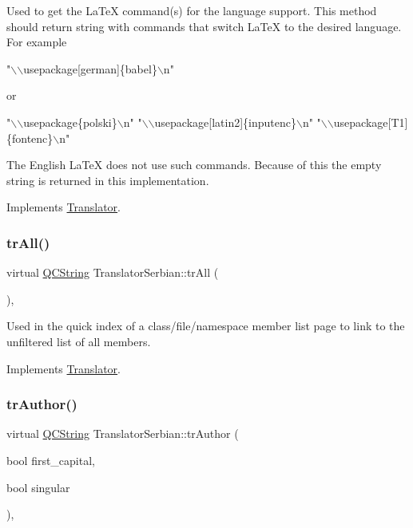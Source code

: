 Used to get the La\+TeX command(s) for the language support. This method should return string with commands that switch La\+TeX to the desired language. For example 
\begin{DoxyPre}"\(\backslash\)\(\backslash\)usepackage[german]\{babel\}\(\backslash\)n"
 \end{DoxyPre}
 or 
\begin{DoxyPre}"\(\backslash\)\(\backslash\)usepackage\{polski\}\(\backslash\)n"
 "\(\backslash\)\(\backslash\)usepackage[latin2]\{inputenc\}\(\backslash\)n"
 "\(\backslash\)\(\backslash\)usepackage[T1]\{fontenc\}\(\backslash\)n"
 \end{DoxyPre}


The English La\+TeX does not use such commands. Because of this the empty string is returned in this implementation. 

Implements \mbox{\hyperlink{class_translator}{Translator}}.

\mbox{\label{class_translator_serbian_a95cac05d61b9c60ec6ce2536bf28079c}} 
\subsubsection{\texorpdfstring{trAll()}{trAll()}}
{\footnotesize\ttfamily virtual \mbox{\hyperlink{class_q_c_string}{Q\+C\+String}} Translator\+Serbian\+::tr\+All (\begin{DoxyParamCaption}{ }\end{DoxyParamCaption})\hspace{0.3cm}{\ttfamily [inline]}, {\ttfamily [virtual]}}

Used in the quick index of a class/file/namespace member list page to link to the unfiltered list of all members. 

Implements \mbox{\hyperlink{class_translator}{Translator}}.

\mbox{\label{class_translator_serbian_a689feaebb833ec2ce0229e6b68cd3937}} 
\subsubsection{\texorpdfstring{trAuthor()}{trAuthor()}}
{\footnotesize\ttfamily virtual \mbox{\hyperlink{class_q_c_string}{Q\+C\+String}} Translator\+Serbian\+::tr\+Author (\begin{DoxyParamCaption}\item[{bool}]{first\+\_\+capital,  }\item[{bool}]{singular }\end{DoxyParamCaption})\hspace{0.3cm}{\ttfamily [inline]}, {\ttfamily [virtual]}}

